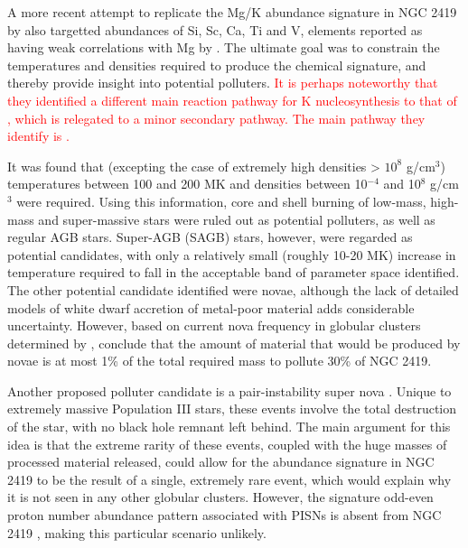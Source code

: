 \documentclass[a4paper,fleqn,usenatbib]{mnras}
\newcommand{\todo}[1]{\textcolor{red}{#1}}
\begin{document}
A more recent attempt to replicate the Mg/K abundance signature in NGC 2419 by \cite{iliadis2016} also targetted abundances of Si, Sc, Ca, Ti and V, elements reported as having weak correlations with Mg by \cite{cohenkirby2012}. The ultimate goal was to constrain the temperatures and densities required to produce the chemical signature, and thereby provide insight into potential polluters. \todo{ It is perhaps noteworthy that they identified a different main reaction pathway for K nucleosynthesis to that of \cite{ventura2012}, which is relegated to a minor secondary pathway. The main pathway they identify is \ce{^{36}Ar(p,\gamma)^{37}K(\beta ^+ \nu)^{37}Ar(p,\gamma)^{38}K(\beta ^+ \nu)^{38}Ar(p,\gamma)^39K}.}

It was found that (excepting the case of extremely high densities > $10^8$ g/cm$^3$) temperatures between 100 and 200 MK and densities between 10$^{-4}$ and 10$^8$ g/cm$^3$ were required. Using this information, core and shell burning of low-mass, high-mass and super-massive stars were ruled out as potential polluters, as well as regular AGB stars. Super-AGB (SAGB) stars, however, were regarded as potential candidates, with only a relatively small (roughly 10-20 MK) increase in temperature required to fall in the acceptable band of parameter space identified. The other potential candidate identified were novae, although the lack of detailed models of white dwarf accretion of metal-poor material adds considerable uncertainty. However, based on current nova frequency in globular clusters determined by \cite{kato2013novae}, \cite{iliadis2016} conclude that the amount of material that would be produced by novae is at most 1\% of the total required mass to pollute 30\% of NGC 2419.

Another proposed  polluter candidate is a pair-instability super nova \citep[PISN;][]{carretta2013}. Unique to extremely massive Population III stars, these events involve the total destruction of the star, with no black hole remnant left behind. The main argument for this idea is that the extreme rarity of these events, coupled with the huge masses of processed material released, could allow for the abundance signature in NGC 2419 to be the result of a single, extremely rare event, which would explain why it is not seen in any other globular clusters. However, the signature odd-even proton number abundance pattern associated with PISNs is absent from NGC 2419 \citep{cohenkirby2012}, making this particular scenario unlikely.

\end{document}
